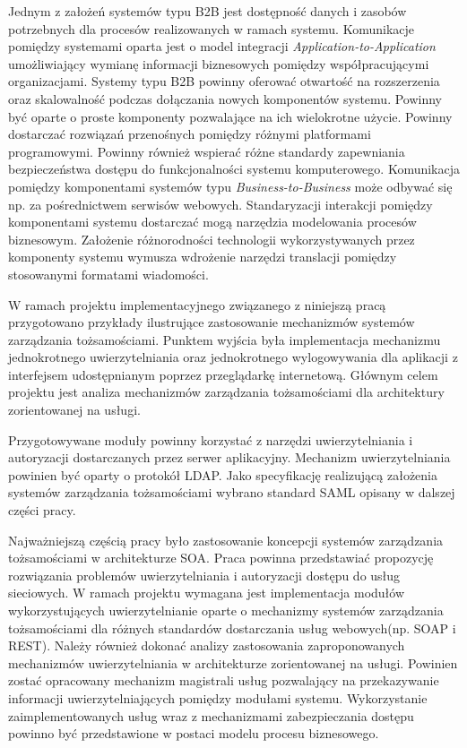 Jednym z założeń systemów typu B2B jest dostępność danych i zasobów potrzebnych dla procesów realizowanych w ramach systemu. Komunikacje pomiędzy systemami oparta jest o model integracji \textit{Application-to-Application} umożliwiający wymianę informacji biznesowych pomiędzy współpracującymi organizacjami. Systemy typu B2B powinny oferować otwartość na rozszerzenia oraz skalowalność podczas dołączania nowych komponentów systemu. Powinny być oparte o proste komponenty pozwalające na ich wielokrotne użycie. Powinny dostarczać rozwiązań przenośnych pomiędzy różnymi platformami programowymi. Powinny również wspierać różne standardy zapewniania bezpieczeństwa dostępu do funkcjonalności systemu komputerowego. Komunikacja pomiędzy komponentami systemów typu \textit{Business-to-Business} może odbywać się np. za pośrednictwem serwisów webowych. Standaryzacji interakcji pomiędzy komponentami systemu dostarczać mogą narzędzia modelowania procesów biznesowym. Założenie różnorodności technologii wykorzystywanych przez komponenty systemu wymusza wdrożenie narzędzi translacji pomiędzy stosowanymi formatami wiadomości.


\label{sec:zakresWymagan}

	W ramach projektu implementacyjnego  związanego z niniejszą pracą przygotowano przykłady ilustrujące zastosowanie mechanizmów systemów zarządzania tożsamościami. Punktem wyjścia była implementacja mechanizmu jednokrotnego uwierzytelniania oraz jednokrotnego wylogowywania dla aplikacji z interfejsem udostępnianym poprzez przeglądarkę internetową. Głównym celem projektu jest analiza mechanizmów zarządzania tożsamościami dla architektury zorientowanej na usługi.

	Przygotowywane moduły powinny korzystać z narzędzi uwierzytelniania i autoryzacji dostarczanych przez serwer aplikacyjny. Mechanizm uwierzytelniania powinien być oparty o protokół LDAP. Jako specyfikację realizującą założenia systemów zarządzania tożsamościami wybrano standard SAML opisany w dalszej części pracy.

	Najważniejszą częścią pracy było zastosowanie koncepcji systemów zarządzania tożsamościami w architekturze SOA. Praca powinna przedstawiać propozycję rozwiązania problemów uwierzytelniania i autoryzacji dostępu do usług sieciowych. W ramach projektu wymagana jest implementacja modułów wykorzystujących uwierzytelnianie oparte o mechanizmy systemów zarządzania tożsamościami dla różnych standardów dostarczania usług webowych(np. SOAP i REST). Należy również dokonać analizy zastosowania zaproponowanych mechanizmów uwierzytelniania w architekturze zorientowanej na usługi. Powinien zostać opracowany mechanizm magistrali usług pozwalający na przekazywanie informacji uwierzytelniających pomiędzy modułami systemu. Wykorzystanie zaimplementowanych usług wraz z mechanizmami zabezpieczania dostępu powinno być przedstawione w postaci modelu procesu biznesowego. 

